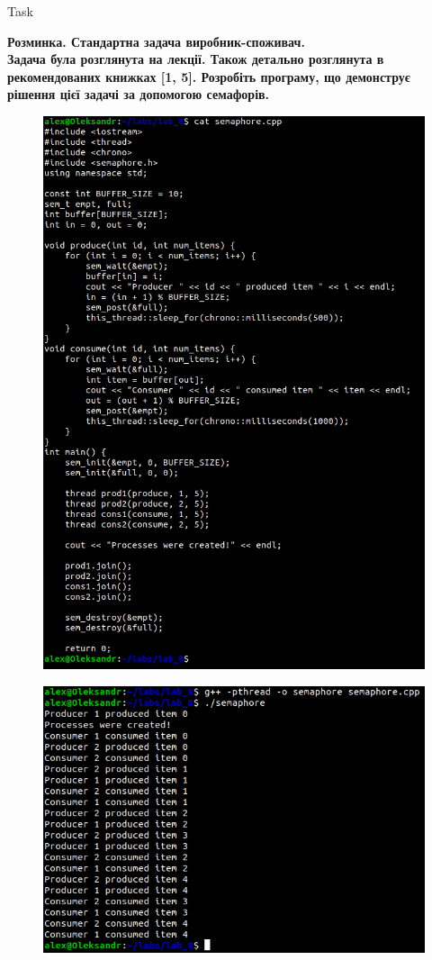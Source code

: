 \documentclass[a4paper,12pt]{article}
\newcommand{\RomanNumeralCaps}[1]{\MakeUppercase{\romannumeral #1}}
\begin{document}
\newpage
    \begin{center}
        \Large{Task \RomanNumeralCaps{1}}
    \end{center}
    \textbf{Розминка. Стандартна задача виробник-споживач. \\
    Задача була розглянута на лекції. Також детально розглянута в рекомендованих книжках [1, 5]. Розробіть
    програму, що демонструє рішення цієї задачі за допомогою семафорів.}
    \begin{figure}[h!]
        \begin{minipage}[h]{1\linewidth}
            \centering
            \includegraphics[width=0.8\linewidth]{Prt sc/Figure_1_1.png}  
        \end{minipage}
    \end{figure}

\newpage
    \begin{figure}[h!]
        \begin{minipage}[h]{1\linewidth}
            \centering
            \includegraphics[width=0.8\linewidth]{Prt sc/Figure_1.png}  
        \end{minipage}
    \end{figure}
\end{document}
